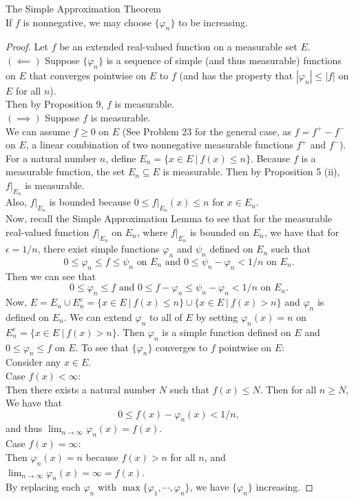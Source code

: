 \begin{flushleft}
\begin{namedthm*}{The Simple Approximation Theorem}
\[        \]
        If $f$ is nonnegative, we may choose $\{\varphi_n\}$ to be increasing.
    \end{namedthm*}
    \begin{proof}
        Let $f$ be an extended real-valued function on a measurable set $E$.\\
        $(\impliedby)$ Suppose $\{\varphi_n\}$ is a sequence of simple (and thus measurable) functions on $E$ that converges pointwise on $E$ to $f$ (and has the property that $|\varphi_n|\le|f|$ on $E$ for all $n$).\\
        Then by Proposition 9, $f$ is measurable.\\
        $(\implies)$ Suppose $f$ is measurable.\\
        We can assume $f\ge0$ on $E$ (See Problem 23 for the general case, as $f=f^+-f^-$ on $E$, a linear combination of two nonnegative measurable functions $f^+$ and $f^-$).
        \\For a natural number $n$, define $E_n=\{x\in E\ |\ f(x)\le n\}$. Because $f$ is a measurable function, the set $E_n\subseteq E$ is measurable.
        Then by Proposition 5 (ii), $f|_{E_n}$ is measurable.\\
        Also, $f|_{E_n}$ is bounded because $0\le f|_{E_n}(x)\le n$ for $x\in E_n$.\\
        Now, recall the Simple Approximation Lemma to see that for the measurable real-valued function $f|_{E_n}$ on $E_n$, where $f|_{E_n}$ is bounded on $E_n$, we have that for $\epsilon=1/n$, there exist simple functions $\varphi_n$ and $\psi_n$ defined on $E_n$ such that
        \[
            0\le\varphi_n\le f\le\psi_n\text{ on }E_n\text{ and }0\le\psi_n-\varphi_n<1/n\text{ on }E_n.    
        \]
        Then we can see that
        \[
            0\le\varphi_n\le f\text{ and }0\le f-\varphi_n\le\psi_n-\varphi_n<1/n\text{ on }E_n.    
        \]
        Now, $E=E_n\cup E_n^c= \{x\in E\ |\ f(x)\le n\}\cup\{x\in E\ |\ f(x)> n\}$ and $\varphi_n$ is defined on $E_n$. We can extend $\varphi_n$ to all of $E$ by setting $\varphi_n(x)=n$ on $E_n^c=\{x\in E\ |\ f(x)> n\}$.
        Then $\varphi_n$ is a simple function defined on $E$ and $0\le \varphi_n\le f$ on $E$.
        To see that $\{\varphi_n\}$ converges to $f$ pointwise on $E$:\\
        Consider any $x\in E$.\\
        Case $f(x)<\infty$:\\
        Then there exists a natural number $N$ such that $f(x)\le N$.
        Then for all $n\ge N$, We have that
        \[
            0\le f(x)-\varphi_n(x)<1/n,    
        \]
        and thus $\lim_{n\to\infty}\varphi_n(x)=f(x)$.\\
        Case $f(x)=\infty$:\\
        Then $\varphi_n(x)=n$ because $f(x)> n$ for all $n$, and $\lim_{n\to\infty}\varphi_n(x)=\infty=f(x)$.\\
        By replacing each $\varphi_n$ with $\max\{\varphi_1,\cdots,\varphi_n\}$, we have $\{\varphi_n\}$ increasing.
    \end{proof}
\end{flushleft}
